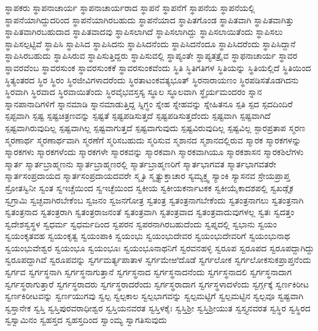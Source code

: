 {ಸ್ಥಾಪಕರು
ಸ್ಥಾಪನಾಚಾರ್ಯ
ಸ್ಥಾಪನಾಚಾರ್ಯರಾದ
ಸ್ಥಾಪನೆ
ಸ್ಥಾಪನೆಗೆ
ಸ್ಥಾಪನೆಯ
ಸ್ಥಾಪನೆಯಲ್ಲಿ
ಸ್ಥಾಪನೆಯಾಗಿದ್ದುದರಿಂದ
ಸ್ಥಾಪನೆಯಾಗಿರಬಹುದು
ಸ್ಥಾಪನೆಯಾದ
ಸ್ಥಾಪಿತಗೊಂಡ
ಸ್ಥಾಪಿತವಾಗಿ
ಸ್ಥಾಪಿತವಾಗಿತ್ತು
ಸ್ಥಾಪಿತವಾಗಿರಬಹುದಾದ
ಸ್ಥಾಪಿತವಾದವು
ಸ್ಥಾಪಿಸಲಾಗಿದೆ
ಸ್ಥಾಪಿಸಲಾಗಿದ್ದು
ಸ್ಥಾಪಿಸಲಾಯಿತೆಂದು
ಸ್ಥಾಪಿಸಲು
ಸ್ಥಾಪಿಸಲ್ಪಟ್ಟಿವೆ
ಸ್ಥಾಪಿಸಿ
ಸ್ಥಾಪಿಸಿದ
ಸ್ಥಾಪಿಸಿದನು
ಸ್ಥಾಪಿಸಿದನೆಂದು
ಸ್ಥಾಪಿಸಿದನೆಂದೂ
ಸ್ಥಾಪಿಸಿದರೆಂದು
ಸ್ಥಾಪಿಸಿದ್ದಾನೆ
ಸ್ಥಾಪಿಸಿರಬಹುದು
ಸ್ಥಾಪಿಸಿರುವ
ಸ್ಥಾಪಿಸುತ್ತಿದ್ದರು
ಸ್ಥಾಪಿಸುವಲ್ಲಿ
ಸ್ಥಾಪ್ಯಂತೇ
ಸ್ಥಾಪ್ಯತತ್ರೈವ
ಸ್ಥಾಫನಾಚಾರ್ಯ
ಸ್ಥಾವರ
ಸ್ಥಾವರವೆಂಬ
ಸ್ಥಾವರಸುಂಕ
ಸ್ಥಾವರಸುಂಕಕೆ
ಸ್ಥಾವರಸುಂಕವೆಂದು
ಸ್ಥಿತಿ
ಸ್ಥಿತಿಗತಿಗಳ
ಸ್ಥಿತಿಯನ್ನು
ಸ್ಥಿತಿಯಲ್ಲಿದೆ
ಸ್ಥಿತಿಯಿಂದ
ಸ್ಥಿತ್ಯಂತರದ
ಸ್ಥಿರ
ಸ್ಥಿರಂ
ಸ್ಥಿರಜೀವಿಗಳಾದರೆಂದು
ಸ್ಥಿರತಾಟಂಕವತ್ಯಭೂತ್
ಸ್ಥಿರನಾರಾಯಣಂ
ಸ್ಥಿರಪಡಿಸತೊಡಗಿದನು
ಸ್ಥಿರವಾಗಿ
ಸ್ಥಿರವಾದ
ಸ್ಥಿರವಾಯಿತೆಂದು
ಸ್ಥಿರವೈಭವಸ್ತಸ್ಯ
ಸ್ಥೂಲ
ಸ್ಥೂಲವಾಗಿ
ಸ್ಥೈರ್ಯಮಂದರಂ
ಸ್ನಾನ
ಸ್ನಾನಪಾನಾದಿಗಳಿಗೆ
ಸ್ನಾನಮಾಡಿ
ಸ್ನಾನಮಾಡುತ್ತಿದ್ದ
ಸ್ನಿಗ್ಧಂ
ಸ್ನೇಹ
ಸ್ನೇಹವನ್ನು
ಸ್ನೇಹಿತನೂ
ಸ್ಪತಿ
ಸ್ಪದ
ಸ್ಪದದಿಂದಿರೆ
ಸ್ಪಪ್ಟವಾಗಿ
ಸ್ಪಷ್ಟ
ಸ್ಪಷ್ಟಚಿತ್ರಣವನ್ನು
ಸ್ಪಷ್ಟತೆ
ಸ್ಪಷ್ಟಪಡಿಸುತ್ತದೆ
ಸ್ಪಷ್ಟಪಡಿಸುತ್ತದೆಂದು
ಸ್ಪಷ್ಟವಾಗಿ
ಸ್ಪಷ್ಟವಾಗಿದೆ
ಸ್ಪಷ್ಟವಾಗಿರುವುದಿಲ್ಲ
ಸ್ಪಷ್ಟವಾಗಿಲ್ಲ
ಸ್ಪಷ್ಟವಾಗುತ್ತದೆ
ಸ್ಪಷ್ಟವಾಗುವುದು
ಸ್ಪಷ್ಟವಿರುವುದಿಲ್ಲ
ಸ್ಪಷ್ಟವಿಲ್ಲ
ಸ್ಫಾರಪ್ರತಾಪ
ಸ್ಮರಣ
ಸ್ಮರಣಾರ್ಥ
ಸ್ಮರಣಾರ್ಥವಾಗಿ
ಸ್ಮರಣೆಗೆ
ಸ್ಮರಿಸಬಹುದು
ಸ್ಮರಿಸುವ
ಸ್ಮಶಾನದ
ಸ್ಮಶಾನದಲ್ಲಿರುವ
ಸ್ಮಾರಕ
ಸ್ಮಾರಕಗಳನ್ನು
ಸ್ಮಾರಕಗಳು
ಸ್ಮಾರಕಗಳೆಂದು
ಸ್ಮಾರಕಗಳೇ
ಸ್ಮಾರಕವನ್ನು
ಸ್ಮಾರಕವಾಗಿ
ಸ್ಮಾರಕವಾಗಿಯೂ
ಸ್ಮಾರಕಶಾಸನ
ಸ್ಮಾರಕಶಿಲೆಗಳು
ಸ್ಮಾರ್ತ
ಸ್ಮಾರ್ತಬ್ರಾಹ್ಮಣನು
ಸ್ಮಾರ್ತಬ್ರಾಹ್ಮಣರಲ್ಲಿ
ಸ್ಮಾರ್ತಬ್ರಾಹ್ಮಣರಿಗೆ
ಸ್ಮಾರ್ತಭಾಗವತ
ಸ್ಮಾರ್ತಭಾಗವತರೇ
ಸ್ಮಾರ್ತಸಂಪ್ರದಾಯದ
ಸ್ಮಾರ್ತಸಂಪ್ರದಾಯದವರೇ
ಸ್ಮೃತಿ
ಸ್ಮೃತ್ಯುಕ್ತಾಚಾರ
ಸ್ಯಮ್ಯಕ್ತ್ವ
ಸ್ಯಾಂಕಿ
ಸ್ಯಾಸನವ
ಸ್ರೇಯಪ್ರಾಪ್ತ
ಸ್ರೋತಸ್ವಿನೀ
ಸ್ವಂತ
ಸ್ವಇಚ್ಚೆಯಿಂದ
ಸ್ವಇಚ್ಛೆಯಿಂದ
ಸ್ವಕೀಯ
ಸ್ವಕೀಯಕರ್ನಾಟಕಕ
ಸ್ವಕೀಯೈಕಾದಶಪಲ್ಲಿ
ಸ್ವಖಡ್ಗೈಕ
ಸ್ವಗ್ರಾಮಿ
ಸ್ವಚ್ಛವಾಗಿರಬೇಕೆಂಬ
ಸ್ವಜನಂ
ಸ್ವಜನಗೋತ್ರ
ಸ್ವತಂತ್ರ
ಸ್ವತಂತ್ರನಾಗಬೇಕೆಂದು
ಸ್ವತಂತ್ರನಾಗಲು
ಸ್ವತಂತ್ರನಾಗಿ
ಸ್ವತಂತ್ರನಾದ
ಸ್ವತಂತ್ರರಾಗಿ
ಸ್ವತಂತ್ರರಾಜನಂತೆ
ಸ್ವತಂತ್ರವಾಗಿ
ಸ್ವತಂತ್ರವಾದ
ಸ್ವತಂತ್ರವಾದುವುಗಳಲ್ಲ
ಸ್ವತಃ
ಸ್ವದತ್ತಂ
ಸ್ವದೇಶಸ್ವಸ್ಥಳ
ಸ್ವಧರ್ಮ
ಸ್ವಧರ್ಮದಿಂದ
ಸ್ವಪರನ
ಸ್ವಪರನಾಗಿರಬಹುದೆಂದು
ಸ್ವಪ್ನದಲ್ಲಿ
ಸ್ವಭಾನು
ಸ್ವಯಂ
ಸ್ವಯಂಕೃತವಹ
ಸ್ವಯಂಕೃತ್ವ
ಸ್ವಯಂಪಾಕಿ
ಸ್ವಯಂಭು
ಸ್ವಯಂಭುದೇವರ
ಸ್ವಯಂಭುದೇವರಿಗೆ
ಸ್ವಯಂಭುನಾಥ
ಸ್ವಯಂಭುವೇಶ್ವರ
ಸ್ವಯಂಭೂ
ಸ್ವಯಂಭೂಃ
ಸ್ವಯಂಭೂನಾಥನಿಗೆ
ಸ್ವರವನಹಳ್ಳಿ
ಸ್ವರೂಪ
ಸ್ವರೂಪದ
ಸ್ವರೂಪದ್ದಾಗಿದ್ದು
ಸ್ವರೂಪದ್ದಾಗಿವೆ
ಸ್ವರೂಪವನ್ನು
ಸ್ವರ್ಗಮರ್ತ್ಯಪಾತಾಳ
ಸ್ವರ್ಗಮೇಱಿದೊಡೆ
ಸ್ವರ್ಗಲೋಕ
ಸ್ವರ್ಗಲೋಕಸುಕಪ್ರಾಪ್ತನೆಂದು
ಸ್ವರ್ಗವ
ಸ್ವರ್ಗಸ್ಥನಾಗಿ
ಸ್ವರ್ಗಸ್ಥನಾಗುತ್ತಾನೆ
ಸ್ವರ್ಗಸ್ಥನಾದ
ಸ್ವರ್ಗಸ್ಥನಾದನೆಂದು
ಸ್ವರ್ಗಸ್ಥನಾದಲಿ
ಸ್ವರ್ಗಸ್ಥನಾದಾಗ
ಸ್ವರ್ಗಸ್ಥರಾಗುತ್ತಾರೆ
ಸ್ವರ್ಗಸ್ಥರಾದರು
ಸ್ವರ್ಗಸ್ಥರಾದರೆಂದು
ಸ್ವರ್ಗಸ್ಥರಾದಾಗ
ಸ್ವರ್ಗಸ್ಥಳಾದಳೆಂದು
ಸ್ವರ್ಗ್ಗಕ್ಕೆ
ಸ್ವರ್ಣಕಿರೀಟ
ಸ್ವರ್ಣಕಿರೀಟವನ್ನು
ಸ್ವರ್ಣಯುಗವು
ಸ್ವಲ್ಪ
ಸ್ವಲ್ಪಕಾಲ
ಸ್ವಲ್ಪಭಾಗವನ್ನು
ಸ್ವಲ್ಪಮಟ್ಟಿಗೆ
ಸ್ವಲ್ಪಮಟ್ಟಿನ
ಸ್ವಲ್ಪವೂ
ಸ್ವಷ್ಟವಾಗಿ
ಸ್ವಸ್ತಾನೇಕ
ಸ್ವಸ್ತಿ
ಸ್ವಸ್ತಿಪುರವರಾಧೀಶ್ವರ
ಸ್ವಸ್ತಿಯನವರತ
ಸ್ವಸ್ತಿಳಕೈಃ
ಸ್ವಸ್ತಿಶ್ರೀ
ಸ್ವಸ್ತಿಶ್ರೀಯುತ
ಸ್ವಸ್ತ್ಯನವರತ
ಸ್ವಸ್ಥಿರ
ಸ್ವಸ್ಥಿರದ
ಸ್ವಸ್ವಾಮಿನಂ
ಸ್ವಹಸ್ತದ
ಸ್ವಹಸ್ತದಿಂದ
ಸ್ವಾಂಮ್ಯ
ಸ್ವಾಗತಿಸುವುದು
}
